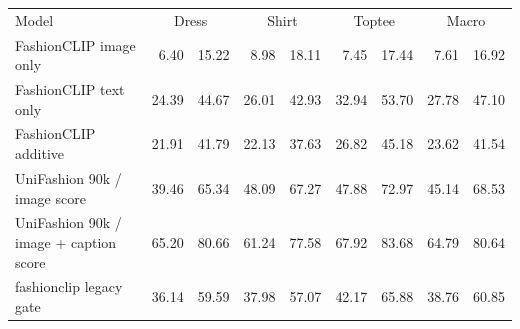 \begin{tabular}{lrrrrrrrr}
\toprule
Model & \multicolumn{2}{c}{Dress} & \multicolumn{2}{c}{Shirt} & \multicolumn{2}{c}{Toptee} & \multicolumn{2}{c}{Macro} \\
FashionCLIP image only & 6.40 & 15.22 & 8.98 & 18.11 & 7.45 & 17.44 & 7.61 & 16.92 \\
FashionCLIP text only & 24.39 & 44.67 & 26.01 & 42.93 & 32.94 & 53.70 & 27.78 & 47.10 \\
FashionCLIP additive & 21.91 & 41.79 & 22.13 & 37.63 & 26.82 & 45.18 & 23.62 & 41.54 \\
UniFashion 90k / image score & 39.46 & 65.34 & 48.09 & 67.27 & 47.88 & 72.97 & 45.14 & 68.53 \\
UniFashion 90k / image + caption score & 65.20 & 80.66 & 61.24 & 77.58 & 67.92 & 83.68 & 64.79 & 80.64 \\
fashionclip legacy gate & 36.14 & 59.59 & 37.98 & 57.07 & 42.17 & 65.88 & 38.76 & 60.85 \\
\bottomrule
\end{tabular}